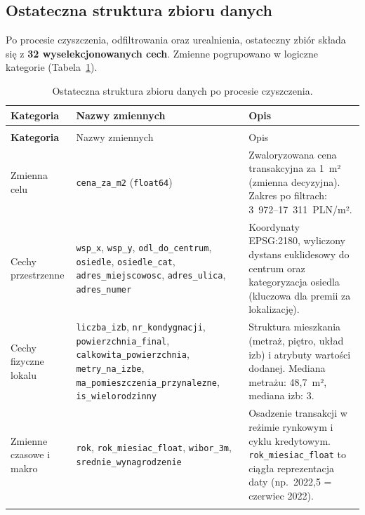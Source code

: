 \documentclass[12pt,a4paper]{article}
\begin{document}
\subsection{Ostateczna struktura zbioru danych}

Po procesie czyszczenia, odfiltrowania oraz urealnienia, ostateczny zbiór składa się z \textbf{32 wyselekcjonowanych cech}. Zmienne pogrupowano w logiczne kategorie (Tabela~\ref{tab:features}).

\begin{longtable}{>{\bfseries}p{3.0cm} >{\raggedright\arraybackslash}p{5.8cm} >{\raggedright\arraybackslash}p{5.4cm}}
  \caption{Ostateczna struktura zbioru danych po procesie czyszczenia.}
  \label{tab:features} \\
  \toprule
  Kategoria & Nazwy zmiennych & Opis \\
  \midrule
  \endfirsthead
  \multicolumn{3}{l}{\footnotesize\itshape (kontynuacja Tabeli~\ref{tab:features})} \\
  \toprule
  Kategoria & Nazwy zmiennych & Opis \\
  \midrule
  \endhead
  \bottomrule
  \endfoot

  Zmienna celu
    & \texttt{cena\_za\_m2} (\texttt{float64})
    & Zwaloryzowana cena transakcyjna za 1~m² (zmienna decyzyjna). Zakres po filtrach: 3~972--17~311~PLN/m². \\
  \addlinespace

  Cechy przestrzenne
    & \texttt{wsp\_x}, \texttt{wsp\_y}, \texttt{odl\_do\_centrum}, \texttt{osiedle}, \texttt{osiedle\_cat}, \texttt{adres\_miejscowosc}, \texttt{adres\_ulica}, \texttt{adres\_numer}
    & Koordynaty EPSG:2180, wyliczony dystans euklidesowy do centrum oraz kategoryzacja osiedla (kluczowa dla premii za lokalizację). \\
  \addlinespace

  Cechy fizyczne lokalu
    & \texttt{liczba\_izb}, \texttt{nr\_kondygnacji}, \texttt{powierzchnia\_final}, \texttt{calkowita\_powierzchnia}, \texttt{metry\_na\_izbe}, \texttt{ma\_pomieszczenia\_przynalezne}, \texttt{is\_wielorodzinny}
    & Struktura mieszkania (metraż, piętro, układ izb) i atrybuty wartości dodanej. Mediana metrażu: 48,7~m², mediana izb: 3. \\
  \addlinespace

  Zmienne czasowe i makro
    & \texttt{rok}, \texttt{rok\_miesiac\_float}, \texttt{wibor\_3m}, \texttt{srednie\_wynagrodzenie}
    & Osadzenie transakcji w reżimie rynkowym i cyklu kredytowym. \texttt{rok\_miesiac\_float} to ciągła reprezentacja daty (np.\ 2022,5 = czerwiec 2022). \\
  \addlinespace


\end{longtable}
\end{document}
